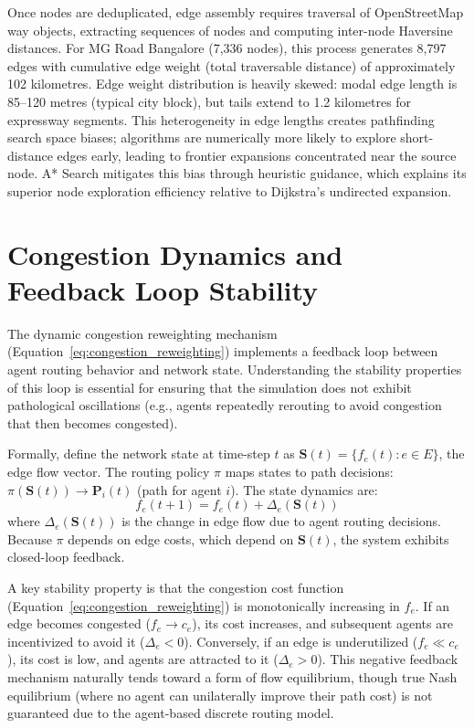 \documentclass[12pt,a4paper,oneside]{report}
\begin{document}
Once nodes are deduplicated, edge assembly requires traversal of OpenStreetMap way objects, extracting sequences of nodes and computing inter-node Haversine distances. For MG Road Bangalore (7,336 nodes), this process generates 8,797 edges with cumulative edge weight (total traversable distance) of approximately 102 kilometres. Edge weight distribution is heavily skewed: modal edge length is 85--120 metres (typical city block), but tails extend to 1.2 kilometres for expressway segments. This heterogeneity in edge lengths creates pathfinding search space biases; algorithms are numerically more likely to explore short-distance edges early, leading to frontier expansions concentrated near the source node. A* Search mitigates this bias through heuristic guidance, which explains its superior node exploration efficiency relative to Dijkstra's undirected expansion.

\section{Congestion Dynamics and Feedback Loop Stability}
The dynamic congestion reweighting mechanism (Equation~\ref{eq:congestion_reweighting}) implements a feedback loop between agent routing behavior and network state. Understanding the stability properties of this loop is essential for ensuring that the simulation does not exhibit pathological oscillations (e.g., agents repeatedly rerouting to avoid congestion that then becomes congested).

Formally, define the network state at time-step $t$ as $\mathbf{S}(t) = \{f_e(t) : e \in E\}$, the edge flow vector. The routing policy $\pi$ maps states to path decisions: $\pi(\mathbf{S}(t)) \rightarrow \mathbf{P}_i(t)$ (path for agent $i$). The state dynamics are:
\begin{equation}
f_e(t+1) = f_e(t) + \Delta_e(\mathbf{S}(t))
\label{eq:state_dynamics}
\end{equation}
where $\Delta_e(\mathbf{S}(t))$ is the change in edge flow due to agent routing decisions. Because $\pi$ depends on edge costs, which depend on $\mathbf{S}(t)$, the system exhibits closed-loop feedback.

A key stability property is that the congestion cost function (Equation~\ref{eq:congestion_reweighting}) is monotonically increasing in $f_e$. If an edge becomes congested ($f_e \to c_e$), its cost increases, and subsequent agents are incentivized to avoid it ($\Delta_e < 0$). Conversely, if an edge is underutilized ($f_e \ll c_e$), its cost is low, and agents are attracted to it ($\Delta_e > 0$). This negative feedback mechanism naturally tends toward a form of flow equilibrium, though true Nash equilibrium (where no agent can unilaterally improve their path cost) is not guaranteed due to the agent-based discrete routing model.
\end{document}
